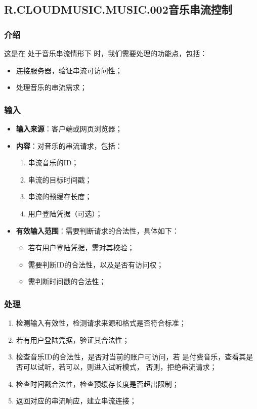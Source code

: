\subsection{R.CLOUDMUSIC.MUSIC.002音乐串流控制}
\subsubsection{介绍}
	这是在 处于音乐串流情形下 时，我们需要处理的功能点，包括：
	\begin{itemize}
		\item 连接服务器，验证串流可访问性；
		\item 处理音乐的串流需求；
	\end{itemize}
\subsubsection{输入}
	\begin{itemize}
		\item \textbf{输入来源}：客户端或网页浏览器；
		\item \textbf{内容}：对音乐的串流请求，包括：
		\begin{enumerate}
			\item 串流音乐的ID；
			\item 串流的目标时间戳；
			\item 串流的预缓存长度；
			\item 用户登陆凭据（可选）；
		\end{enumerate}
		\item \textbf{有效输入范围}：需要判断请求的合法性，具体如下：
		\begin{itemize}
			\item 若有用户登陆凭据，需对其校验； 
			\item 需要判断ID的合法性，以及是否有访问权；
			\item 需判断时间戳的合法性； 
		\end{itemize}
	\end{itemize}
\subsubsection{处理}
	\begin{enumerate}
		\item 检测输入有效性，检测请求来源和格式是否符合标准；
		\item 若有用户登陆凭据，验证其合法性；
		\item 检查音乐ID的合法性，是否对当前的账户可访问，若
			是付费音乐，查看其是否可以试听，若可以，则进入试听模式，
			否则，拒绝串流请求；
		\item 检查时间戳合法性，检查预缓存长度是否超出限制；
		\item 返回对应的串流响应，建立串流连接；
	\end{enumerate}
